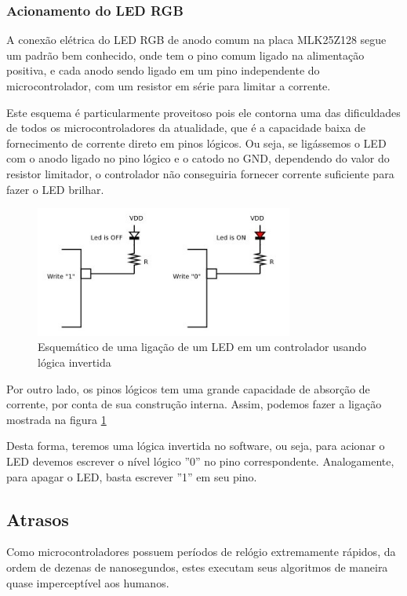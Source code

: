 \documentclass{article}
\begin{document}
\subsubsection{Acionamento do LED RGB}

A conexão elétrica do LED RGB de anodo comum na placa MLK25Z128 segue um padrão bem conhecido, onde tem o pino comum ligado na alimentação positiva, e cada anodo sendo ligado em um pino independente do microcontrolador, com um resistor em série para limitar a corrente.

Este esquema é particularmente proveitoso pois ele contorna uma das dificuldades de todos os microcontroladores da atualidade, que é a capacidade baixa de fornecimento de corrente direto em pinos lógicos. Ou seja, se ligássemos o LED com o anodo ligado no pino lógico e o catodo no GND, dependendo do valor do resistor limitador, o controlador não conseguiria fornecer corrente suficiente para fazer o LED brilhar.

\begin{figure}[ht!]
\centering
\includegraphics[width=85mm]{led_connect_sink.png}
\caption{Esquemático de uma ligação de um LED em um controlador usando lógica invertida \label{led_sink}}
\end{figure}


Por outro lado, os pinos lógicos tem uma grande capacidade de absorção de corrente, por conta de sua construção interna. Assim, podemos fazer a ligação mostrada na figura \ref{led_sink}

Desta forma, teremos uma lógica invertida no software, ou seja, para acionar o LED devemos escrever o nível lógico ''0'' no pino correspondente. Analogamente, para apagar o LED, basta escrever ''1'' em seu pino.

\subsection{Atrasos}

Como microcontroladores possuem períodos de relógio extremamente rápidos, da ordem de dezenas de nanosegundos, estes executam seus algoritmos de maneira quase imperceptível aos humanos.
\end{document}
